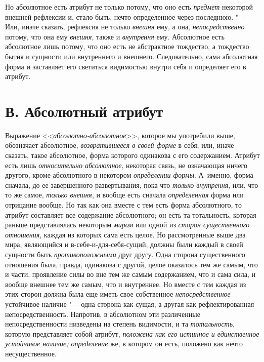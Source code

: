 Но абсолютное есть атрибут не только потому, что оно есть
{\em предмет} некоторой внешней рефлексии и, стало
быть, нечто определенное через последнюю. "--- Или, иначе сказать, рефлексия
не только {\em внешня} ему, а она,
{\em непосредственно} потому, что она ему
{\em внешня}, также и
{\em внутрення} ему. Абсолютное есть абсолютное лишь
потому, что оно есть не абстрактное тождество, а тождество бытия и сущности
или внутреннего и внешнего. Следовательно, сама абсолютная форма и
заставляет его светиться видимостью внутри себя и определяет его в атрибут.


\section[В. Абсолютный атрибут]{В. Абсолютный атрибут}

Выражение <<{\em абсолютно-абсолютное}>>, которое мы употребили
выше, обозначает абсолютное, {\em возвратившееся в
своей форме} в себя, или, иначе сказать, такое абсолютное, форма которого
одинакова с его содержанием. Атрибут есть лишь
{\em относительно абсолютное}, некоторая связь, не
означающая ничего другого, кроме абсолютного в некотором
{\em определении формы}. А~именно, форма сначала, до ее
завершенного развертывания, пока что {\em только
внутрення}, или, что то же самое, {\em только внешня},
и вообще есть сначала {\em определенная} форма или
отрицание вообще. Но так как она вместе с тем есть форма абсолютного, то
атрибут составляет все содержание абсолютного; он есть та тотальность,
которая раньше представлялась некоторым {\em миром} или
одной из {\em сторон существенного отношения}, каждая
из которых сама есть целое. Но рассмотренные выше два мира, являющийся и
в-себе-и-для-себя-сущий, должны были каждый в своей сущности быть
{\em противоположными} друг другу. Одна сторона
существенного отношения была, правда, одинакова с другой, целое оказалось
тем же самым, что и части, проявление силы во вне тем же самым содержанием,
что и сама сила, и вообще внешнее тем же самым, что и внутреннее. Но вместе
с тем каждая из этих сторон должна была еще иметь свое собственное
{\em непосредственное} устойчивое наличие "--- одна
сторона как сущая, а другая как рефлектированная непосредственность.
Напротив, в абсолютном эти различенные непосредственности низведены на
степень видимости, и та {\em тотальность}, которую
представляет собой атрибут, {\em положена как его
истинное и единственное устойчивое наличие; определение} же, в котором он
есть, положено как нечто несущественное.


